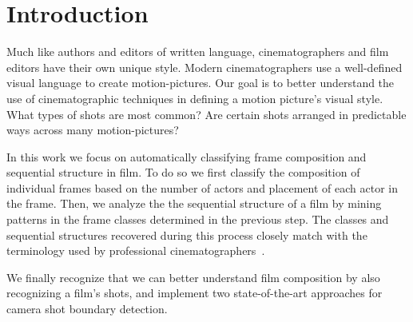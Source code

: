 \section*{Introduction}

Much like authors and editors of written language, cinematographers and film editors have their own unique style.
Modern cinematographers use a well-defined visual language to create motion-pictures. Our goal is to better understand the use of cinematographic techniques in defining a motion picture’s visual style. What types of shots are most common? Are certain shots arranged in predictable ways across many motion-pictures?

In this work we focus on automatically classifying frame composition and sequential structure in film.  To do so we first classify the composition of individual frames based on the number of actors and placement of each actor in the frame.  Then, we analyze the the sequential structure of a film by mining patterns in the frame classes determined in the previous step.  The classes and sequential structures recovered during this process closely match with the terminology used by professional cinematographers~\cite{}.  

We finally recognize that we can better understand film composition by also recognizing a film's shots, and implement two state-of-the-art approaches for camera shot boundary detection.